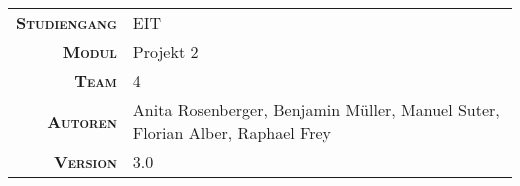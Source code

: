 \begin{titlepage}

    \maketitle

    \vspace{60mm}

    \begin{tabular}{r|l}

        \textsc{\textbf{Studiengang}}
        & EIT\\
        [4mm]

        \textsc{\textbf{Modul}}
        & Projekt 2 \\
        [4mm]

        \textsc{\textbf{Team}}
        & 4 \\
        [4mm]

        \textsc{\textbf{Autoren}}
        & Anita Rosenberger, Benjamin M\"uller, Manuel Suter, Florian Alber, Raphael Frey\\
        [4mm]

        \textsc{\textbf{Version}}
        & 3.0 \\
    \end{tabular}

\end{titlepage}
